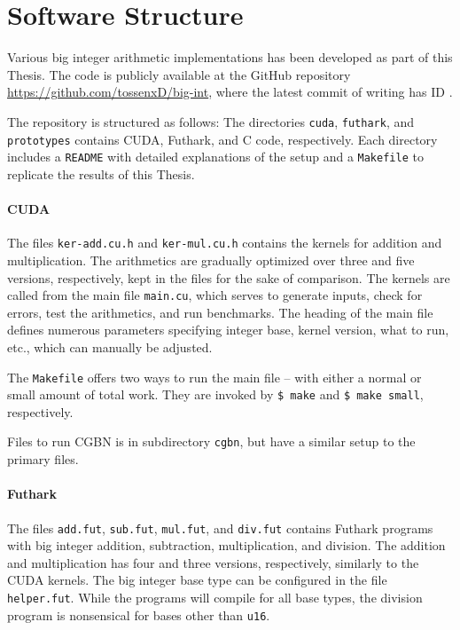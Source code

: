 \section{Software Structure}
\label{sec:software}

Various big integer arithmetic implementations has been developed as part of
this Thesis. The code is publicly available at the GitHub repository
\url{https://github.com/tossenxD/big-int}, where the latest commit of writing
has ID {}.

The repository is structured as follows: The directories \texttt{cuda},
\texttt{futhark}, and \texttt{prototypes} contains CUDA, Futhark, and C code,
respectively. Each directory includes a \texttt{README} with detailed
explanations of the setup and a \texttt{Makefile} to replicate the results of
this Thesis.

\paragraph{CUDA}
The files \texttt{ker-add.cu.h} and \texttt{ker-mul.cu.h} contains the kernels
for addition and multiplication. The arithmetics are gradually optimized over
three and five versions, respectively, kept in the files for the sake of
comparison. The kernels are called from the main file \texttt{main.cu}, which
serves to generate inputs, check for errors, test the arithmetics, and run
benchmarks. The heading of the main file defines numerous parameters specifying
integer base, kernel version, what to run, etc., which can manually be adjusted.

The \texttt{Makefile} offers two ways to run the main file -- with either a
normal or small amount of total work. They are invoked by \texttt{\$ make} and
\texttt{\$ make small}, respectively.

Files to run CGBN is in subdirectory \texttt{cgbn}, but have a similar setup to
the primary files.

\paragraph{Futhark}
The files \texttt{add.fut}, \texttt{sub.fut}, \texttt{mul.fut}, and
\texttt{div.fut} contains Futhark programs with big integer addition,
subtraction, multiplication, and division. The addition and multiplication has four
and three versions, respectively, similarly to the CUDA kernels. The big integer
base type can be configured in the file \texttt{helper.fut}. While the programs
will compile for all base types, the division program is nonsensical for bases
other than \texttt{u16}.

